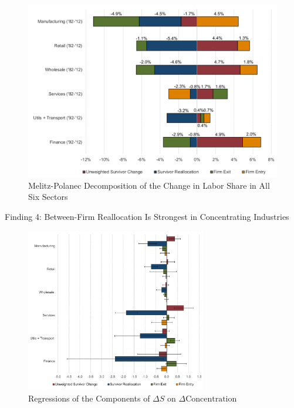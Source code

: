 \documentclass[
  10pt,
  ignorenonframetext,
  aspectratio=43,
]{beamer}
\begin{document}
\begin{frame}
\begin{figure}
\centering
\includegraphics{./images/Pasted image 20220516210943.png}
\caption{Melitz-Polanec Decomposition of the Change in Labor Share in
All Six Sectors}
\end{figure}
\end{frame}

\begin{frame}{Finding 4: Between-Firm Reallocation Is Strongest in
Concentrating Industries}
\protect\hypertarget{finding-4-between-firm-reallocation-is-strongest-in-concentrating-industries}{}
\begin{figure}
\centering
\includegraphics[width=0.7\textwidth,height=\textheight]{./images/Pasted image 20220516211934.png}
\caption{Regressions of the Components of \(\Delta S\) on
\(\Delta\text{Concentration}\)}
\end{figure}
\end{frame}
\end{document}

